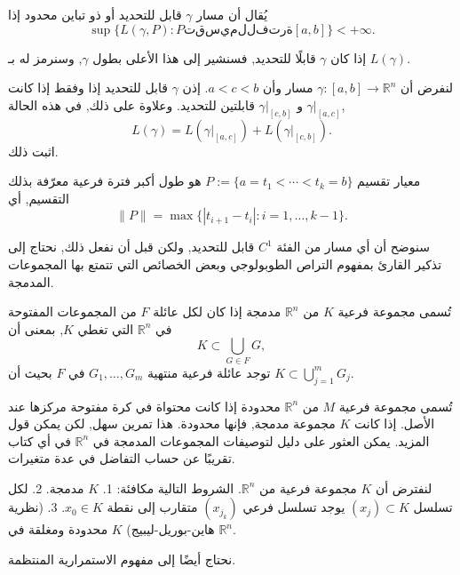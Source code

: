 \begin{definition}
يُقال أن مسار \( \gamma \) قابل للتحديد أو ذو تباين محدود إذا
\[ \sup \{L(\gamma, P) : P تقسيم للفترة [a, b]\} < +\infty. \]

إذا كان \( \gamma \) قابلًا للتحديد, فسنشير إلى هذا الأعلى بطول \( \gamma \), وسنرمز له بـ \( L(\gamma) \).
\end{definition}

لنفرض أن \( \gamma : [a, b] \to \mathbb{R}^n \) مسار وأن \( a < c < b \). إذن \( \gamma \) قابل للتحديد إذا وفقط إذا كانت \( \gamma|_{[a, c]} \) و \( \gamma|_{[c, b]} \) قابلتين للتحديد. وعلاوة على ذلك, في هذه الحالة,
\[ L(\gamma) = L(\gamma|_{[a, c]}) + L(\gamma|_{[c, b]}). \]
اثبت ذلك.

\begin{definition}
    
معيار تقسيم \( P := \{a = t_1 < \cdots < t_k = b\} \) هو طول أكبر فترة فرعية معرّفة بذلك التقسيم, أي
\[ \|P\| = \max \{|t_{i+1} - t_i| : i = 1, \ldots, k - 1\}. \]
\end{definition}

سنوضح أن أي مسار من الفئة \( C^1 \) قابل للتحديد, ولكن قبل أن نفعل ذلك, نحتاج إلى تذكير القارئ بمفهوم التراص الطوبولوجي وبعض الخصائص التي تتمتع بها المجموعات المدمجة.

\begin{definition}
تُسمى مجموعة فرعية \( K \) من \( \mathbb{R}^n \) مدمجة إذا كان لكل عائلة \( F \) من المجموعات المفتوحة في \( \mathbb{R}^n \) التي تغطي \( K \), بمعنى أن
\[ K \subset \bigcup_{G \in F} G, \]
توجد عائلة فرعية منتهية \( G_1, \ldots, G_m \) في \( F \) بحيث أن \( K \subset \bigcup_{j=1}^{m} G_j \).
\end{definition}

تُسمى مجموعة فرعية \( M \) من \( \mathbb{R}^n \) محدودة إذا كانت محتواة في كرة مفتوحة مركزها عند الأصل. إذا كانت \( K \) مجموعة مدمجة, فإنها محدودة. هذا تمرين سهل, لكن يمكن قول المزيد. يمكن العثور على دليل لتوصيفات المجموعات المدمجة في \( \mathbb{R}^n \) في أي كتاب تقريبًا عن حساب التفاضل في عدة متغيرات.

\begin{theoreme}
لنفترض أن \( K \) مجموعة فرعية من \( \mathbb{R}^n \). الشروط التالية مكافئة:
1. \( K \) مدمجة.
2. لكل تسلسل \( (x_j) \subset K \) يوجد تسلسل فرعي \( (x_{j_k}) \) متقارب إلى نقطة \( x_0 \in K \).
3. (نظرية هاين-بوريل-ليبيج) \( K \) محدودة ومغلقة في \( \mathbb{R}^n \).
\end{theoreme}

نحتاج أيضًا إلى مفهوم الاستمرارية المنتظمة.

